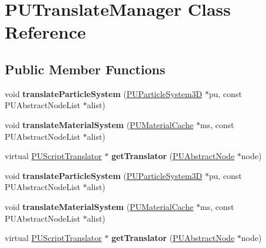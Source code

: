 \hypertarget{classPUTranslateManager}{}\section{P\+U\+Translate\+Manager Class Reference}
\label{classPUTranslateManager}
\subsection*{Public Member Functions}
\begin{DoxyCompactItemize}
\item 
\mbox{\label{classPUTranslateManager_a8702fecdc86ff66e6e61aa59c91af9bf}} 
void {\bfseries translate\+Particle\+System} (\hyperlink{classPUParticleSystem3D}{P\+U\+Particle\+System3D} $\ast$pu, const P\+U\+Abstract\+Node\+List $\ast$alist)
\item 
\mbox{\label{classPUTranslateManager_a2baeb2d700a844e79e417bf0bb39e50d}} 
void {\bfseries translate\+Material\+System} (\hyperlink{classPUMaterialCache}{P\+U\+Material\+Cache} $\ast$ms, const P\+U\+Abstract\+Node\+List $\ast$alist)
\item 
\mbox{\label{classPUTranslateManager_a320a84d434a8d855f6154e3c256a336b}} 
virtual \hyperlink{classPUScriptTranslator}{P\+U\+Script\+Translator} $\ast$ {\bfseries get\+Translator} (\hyperlink{classPUAbstractNode}{P\+U\+Abstract\+Node} $\ast$node)
\item 
\mbox{\label{classPUTranslateManager_a8702fecdc86ff66e6e61aa59c91af9bf}} 
void {\bfseries translate\+Particle\+System} (\hyperlink{classPUParticleSystem3D}{P\+U\+Particle\+System3D} $\ast$pu, const P\+U\+Abstract\+Node\+List $\ast$alist)
\item 
\mbox{\label{classPUTranslateManager_a2baeb2d700a844e79e417bf0bb39e50d}} 
void {\bfseries translate\+Material\+System} (\hyperlink{classPUMaterialCache}{P\+U\+Material\+Cache} $\ast$ms, const P\+U\+Abstract\+Node\+List $\ast$alist)
\item 
\mbox{\label{classPUTranslateManager_a0bb9e0c5d62360f27a7c1e616953cb3b}} 
virtual \hyperlink{classPUScriptTranslator}{P\+U\+Script\+Translator} $\ast$ {\bfseries get\+Translator} (\hyperlink{classPUAbstractNode}{P\+U\+Abstract\+Node} $\ast$node)
\end{DoxyCompactItemize}
